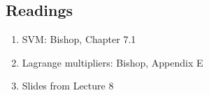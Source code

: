 \documentclass[main]{subfiles}
\begin{document}
\subsection{Readings}
\begin{enumerate}
\item SVM: Bishop, Chapter 7.1
\item Lagrange multipliers: Bishop, Appendix E
\item Slides from Lecture 8
\end{enumerate}
\end{document}
